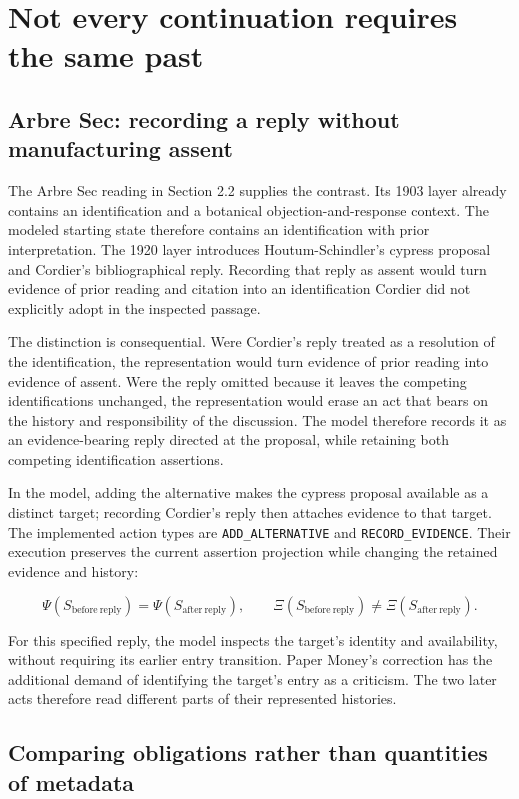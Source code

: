 \documentclass[11pt,a4paper]{article}
\begin{document}
\section{Not every continuation requires the same past}

\subsection{Arbre Sec: recording a reply without manufacturing assent}

The Arbre Sec reading in Section 2.2 supplies the contrast. Its 1903 layer already contains an identification and a botanical objection-and-response context. The modeled starting state therefore contains an identification with prior interpretation. The 1920 layer introduces Houtum-Schindler's cypress proposal and Cordier's bibliographical reply. Recording that reply as assent would turn evidence of prior reading and citation into an identification Cordier did not explicitly adopt in the inspected passage.


The distinction is consequential. Were Cordier's reply treated as a resolution of the identification, the representation would turn evidence of prior reading into evidence of assent. Were the reply omitted because it leaves the competing identifications unchanged, the representation would erase an act that bears on the history and responsibility of the discussion. The model therefore records it as an evidence-bearing reply directed at the proposal, while retaining both competing identification assertions.


In the model, adding the alternative makes the cypress proposal available as a distinct target; recording Cordier's reply then attaches evidence to that target. The implemented action types are \texttt{ADD\_ALTERNATIVE} and \texttt{RECORD\_EVIDENCE}. Their execution preserves the current assertion projection while changing the retained evidence and history:


\[
\Psi(S_{\mathrm{before\ reply}})=\Psi(S_{\mathrm{after\ reply}}),
\qquad
\Xi(S_{\mathrm{before\ reply}})\ne\Xi(S_{\mathrm{after\ reply}}).
\]

For this specified reply, the model inspects the target's identity and availability, without requiring its earlier entry transition. Paper Money's correction has the additional demand of identifying the target's entry as a criticism. The two later acts therefore read different parts of their represented histories.


\subsection{Comparing obligations rather than quantities of metadata}
\end{document}
